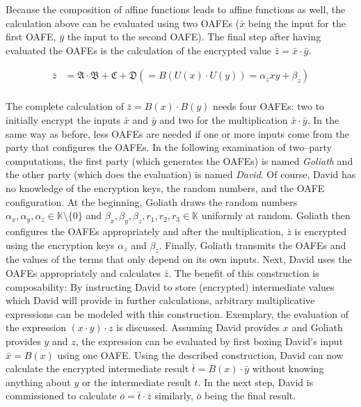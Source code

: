 \noindent{}Because the composition of affine functions leads to affine functions
as well, the calculation above can be evaluated using two OAFEs ($\bar{x}$ being
the input for the first OAFE, $\bar{y}$ the input to the second OAFE). The final
step after having evaluated the OAFEs is the calculation of the encrypted value
$\bar{z} = \bar{x} \cdot \bar{y}$.

\begin{align*}
  \bar{z} & = \mathfrak{A} \cdot \mathfrak{B} + \mathfrak{C} + \mathfrak{D}
  (= B(U(x) \cdot U(y)) = \alpha_z xy + \beta_z)\\
\end{align*}

\noindent{}The complete calculation of $\bar{z} = B(x) \cdot B(y)$ needs four
OAFEs: two to initially encrypt the inputs $\bar x$ and $\bar y$ and two for the
multiplication $\bar{x} \cdot \bar{y}$. In the same way as before, less OAFEs
are needed if one or more inputs come from the party that configures the OAFEs.
In the following examination of two--party computations, the first party (which
generates the OAFEs) is named \emph{Goliath} and the other party (which does the
evaluation) is named \emph{David}. Of course, David has no knowledge of the
encryption keys, the random numbers, and the OAFE configuration. At the
beginning, Goliath draws the random numbers $\alpha_x, \alpha_y, \alpha_z \in
\mathbb{K} \setminus \{0\}$ and $\beta_x, \beta_y, \beta_z, r_1, r_2, r_3 \in
\mathbb{K}$ uniformly at random.  Goliath then configures the OAFEs
appropriately and after the multiplication, $\bar{z}$ is encrypted using the
encryption keys $\alpha_z$ and $\beta_z$. Finally, Goliath transmits the OAFEs
and the values of the terms that only depend on its own inputs. Next, David uses
the OAFEs appropriately and calculates $\bar{z}$. The benefit of this
construction is composability: By instructing David to store (encrypted)
intermediate values which David will provide in further calculations, arbitrary
multiplicative expressions can be modeled with this construction. Exemplary, the
evaluation of the expression $(x \cdot y) \cdot z$ is discussed. Assuming David
provides $x$ and Goliath provides $y$ and $z$, the expression can be evaluated
by first boxing David's input $\bar{x} = B(x)$ using one OAFE\@. Using the
described construction, David can now calculate the encrypted intermediate
result $\bar{t} = B(x) \cdot \bar{y}$ without knowing anything about $y$ or the
intermediate result $t$. In the next step, David is commissioned to calculate
$\bar{o} = \bar{t} \cdot \bar{z}$ similarly, $\bar{o}$ being the final result.

